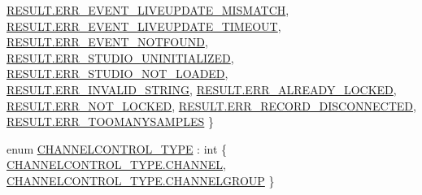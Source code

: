 \begin{DoxyCompactItemize}
\newline
\hyperlink{namespace_f_m_o_d_a305d1176ef3f8c8815861a60407ac33dac9a4e7f0a340042eb79802ec77b102d0}{R\+E\+S\+U\+L\+T.\+E\+R\+R\+\_\+\+E\+V\+E\+N\+T\+\_\+\+L\+I\+V\+E\+U\+P\+D\+A\+T\+E\+\_\+\+M\+I\+S\+M\+A\+T\+CH}, 
\hyperlink{namespace_f_m_o_d_a305d1176ef3f8c8815861a60407ac33da67a2b7f1f87e3044cb8200b369b5c564}{R\+E\+S\+U\+L\+T.\+E\+R\+R\+\_\+\+E\+V\+E\+N\+T\+\_\+\+L\+I\+V\+E\+U\+P\+D\+A\+T\+E\+\_\+\+T\+I\+M\+E\+O\+UT}, 
\hyperlink{namespace_f_m_o_d_a305d1176ef3f8c8815861a60407ac33da8ca717b6f5576e9cde99f5fb26d1ed5b}{R\+E\+S\+U\+L\+T.\+E\+R\+R\+\_\+\+E\+V\+E\+N\+T\+\_\+\+N\+O\+T\+F\+O\+U\+ND}, 
\hyperlink{namespace_f_m_o_d_a305d1176ef3f8c8815861a60407ac33dad1fd27e78d823e75f791a3ffded0ff5e}{R\+E\+S\+U\+L\+T.\+E\+R\+R\+\_\+\+S\+T\+U\+D\+I\+O\+\_\+\+U\+N\+I\+N\+I\+T\+I\+A\+L\+I\+Z\+ED}, 
\newline
\hyperlink{namespace_f_m_o_d_a305d1176ef3f8c8815861a60407ac33da004b75583df4490248b157cb3fc96ad6}{R\+E\+S\+U\+L\+T.\+E\+R\+R\+\_\+\+S\+T\+U\+D\+I\+O\+\_\+\+N\+O\+T\+\_\+\+L\+O\+A\+D\+ED}, 
\hyperlink{namespace_f_m_o_d_a305d1176ef3f8c8815861a60407ac33dabc8fbf6fbbc7d816d0dca53079b2e00e}{R\+E\+S\+U\+L\+T.\+E\+R\+R\+\_\+\+I\+N\+V\+A\+L\+I\+D\+\_\+\+S\+T\+R\+I\+NG}, 
\hyperlink{namespace_f_m_o_d_a305d1176ef3f8c8815861a60407ac33da4d2ffb7531f582cc8941476ee3634175}{R\+E\+S\+U\+L\+T.\+E\+R\+R\+\_\+\+A\+L\+R\+E\+A\+D\+Y\+\_\+\+L\+O\+C\+K\+ED}, 
\hyperlink{namespace_f_m_o_d_a305d1176ef3f8c8815861a60407ac33da4a5d4110f998a029ca7820b2409e4907}{R\+E\+S\+U\+L\+T.\+E\+R\+R\+\_\+\+N\+O\+T\+\_\+\+L\+O\+C\+K\+ED}, 
\newline
\hyperlink{namespace_f_m_o_d_a305d1176ef3f8c8815861a60407ac33daa09ace88ced8b1bc2f0c5c4d6a888b6b}{R\+E\+S\+U\+L\+T.\+E\+R\+R\+\_\+\+R\+E\+C\+O\+R\+D\+\_\+\+D\+I\+S\+C\+O\+N\+N\+E\+C\+T\+ED}, 
\hyperlink{namespace_f_m_o_d_a305d1176ef3f8c8815861a60407ac33dacbafc77fb7abb6110c00939e56552c12}{R\+E\+S\+U\+L\+T.\+E\+R\+R\+\_\+\+T\+O\+O\+M\+A\+N\+Y\+S\+A\+M\+P\+L\+ES}
 \}
\item 
enum \hyperlink{namespace_f_m_o_d_adc4f7881733d8b2dc1577194a8e248e4}{C\+H\+A\+N\+N\+E\+L\+C\+O\+N\+T\+R\+O\+L\+\_\+\+T\+Y\+PE} \+: int \{ \hyperlink{namespace_f_m_o_d_adc4f7881733d8b2dc1577194a8e248e4af52e9c50a060add65a035429b2a22229}{C\+H\+A\+N\+N\+E\+L\+C\+O\+N\+T\+R\+O\+L\+\_\+\+T\+Y\+P\+E.\+C\+H\+A\+N\+N\+EL}, 
\hyperlink{namespace_f_m_o_d_adc4f7881733d8b2dc1577194a8e248e4ad62053e09978504a6564e63546c843b6}{C\+H\+A\+N\+N\+E\+L\+C\+O\+N\+T\+R\+O\+L\+\_\+\+T\+Y\+P\+E.\+C\+H\+A\+N\+N\+E\+L\+G\+R\+O\+UP}
 \}
\item 

\end{DoxyCompactItemize}
